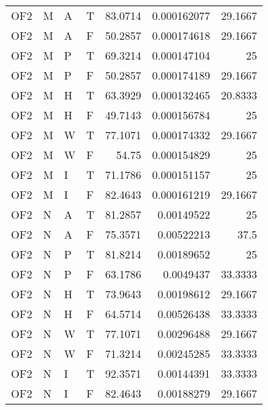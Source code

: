 \begin{tabular}{llllrrr}
    OF2      & M     & A     & T          & 83.0714    & 0.000162077 & 29.1667  \\
    OF2      & M     & A     & F          & 50.2857    & 0.000174618 & 29.1667  \\
    OF2      & M     & P     & T          & 69.3214    & 0.000147104 & 25       \\
    OF2      & M     & P     & F          & 50.2857    & 0.000174189 & 29.1667  \\
    OF2      & M     & H     & T          & 63.3929    & 0.000132465 & 20.8333  \\
    OF2      & M     & H     & F          & 49.7143    & 0.000156784 & 25       \\
    OF2      & M     & W     & T          & 77.1071    & 0.000174332 & 29.1667  \\
    OF2      & M     & W     & F          & 54.75      & 0.000154829 & 25       \\
    OF2      & M     & I     & T          & 71.1786    & 0.000151157 & 25       \\
    OF2      & M     & I     & F          & 82.4643    & 0.000161219 & 29.1667  \\
    OF2      & N     & A     & T          & 81.2857    & 0.00149522  & 25       \\
    OF2      & N     & A     & F          & 75.3571    & 0.00522213  & 37.5     \\
    OF2      & N     & P     & T          & 81.8214    & 0.00189652  & 25       \\
    OF2      & N     & P     & F          & 63.1786    & 0.0049437   & 33.3333  \\
    OF2      & N     & H     & T          & 73.9643    & 0.00198612  & 29.1667  \\
    OF2      & N     & H     & F          & 64.5714    & 0.00526438  & 33.3333  \\
    OF2      & N     & W     & T          & 77.1071    & 0.00296488  & 29.1667  \\
    OF2      & N     & W     & F          & 71.3214    & 0.00245285  & 33.3333  \\
    OF2      & N     & I     & T          & 92.3571    & 0.00144391  & 33.3333  \\
    OF2      & N     & I     & F          & 82.4643    & 0.00188279  & 29.1667  \\
    \hline
\end{tabular}